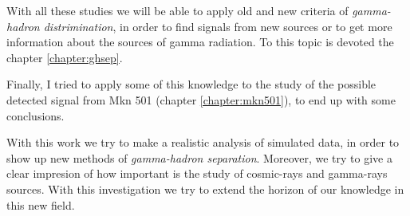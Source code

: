 With all these studies we will be able to apply old and new criteria
of \emph{gamma-hadron distrimination}, in order to find signals from
new sources or to get more information about the sources of gamma
radiation. To this topic is devoted the chapter \ref{chapter:ghsep}.

Finally, I tried to apply some of this knowledge to the study of the
possible detected signal from Mkn 501 (chapter \ref{chapter:mkn501}),
to end up with some conclusions.

With this work we try to make a realistic analysis of simulated data,
in order to show up new methods of \emph{gamma-hadron separation}.
Moreover, we try to give a clear impresion of how important is the
study of cosmic-rays and gamma-rays sources. With this investigation
we try to extend the horizon of our knowledge in this new field.

\endinput
%


